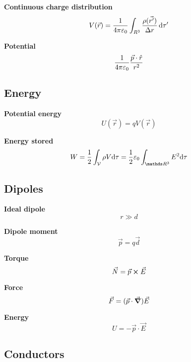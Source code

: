 \documentclass[10pt]{extarticle}
\numberwithin{equation}{section}
\begin{document}
\begin{multicols}{2}
	\textbf{Continuous charge distribution}
	\begin{equation}
		V(\vec{r}) = \frac{1}{4 \pi \varepsilon_0} \int_{R^3} \frac{\rho(\vec{r'})}{\Delta r} \dd{\tau'}
	\end{equation}

	\textbf{Potential}
	\begin{equation}
		\frac{1}{4 \pi \varepsilon_0} \frac{\vec p \cdot \hat r}{r^2}
	\end{equation}

	\subsection{Energy}

	\textbf{Potential energy}
	\begin{equation}
		U(\vec r) = q V(\vec r)
	\end{equation}

	\textbf{Energy stored}
	\begin{equation}
		W = \half \int_{\mathcal V} \rho V \dd \tau = \half \varepsilon_0 \int_{\R^3} E^2 \dd \tau
	\end{equation}

	\subsection{Dipoles}

	\textbf{Ideal dipole}
	\begin{equation}
		r \gg d
	\end{equation}

	\textbf{Dipole moment}
	\begin{equation}
		\vec p = q \vec d
	\end{equation}

	\textbf{Torque}
	\begin{equation}
		\vec N = \vec p \cross \vec E
	\end{equation}

	\textbf{Force}
	\begin{equation}
		\vec F = (\vec p \cdot \grad) \vec E
	\end{equation}

	\textbf{Energy}
	\begin{equation}
		U = - \vec p \cdot \vec E
	\end{equation}

	\subsection{Conductors}


\end{multicols}
\end{document}
